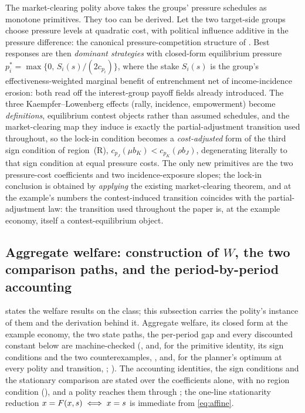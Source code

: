 The market-clearing polity above takes the groups' pressure schedules
as monotone primitives. They too can be derived. Let the two
target-side groups choose pressure levels at quadratic cost, with
political influence additive in the pressure difference: the
canonical pressure-competition structure of \citet{Becker1983}. Best
responses are then \emph{dominant strategies} with closed-form
equilibrium pressure $p_i^\ast = \max\{0,\,S_i(s)/(2c_{p_i})\}$, where
the stake $S_i(s)$ is the group's effectiveness-weighted marginal
benefit of entrenchment net of income-incidence erosion: both read
off the interest-group payoff fields already introduced. The three
Kaempfer--Lowenberg effects (rally, incidence, empowerment) become
\emph{definitions}, equilibrium contest objects rather than assumed
schedules, and the market-clearing map they induce is exactly the
partial-adjustment transition used throughout, so the lock-in
condition becomes a \emph{cost-adjusted} form of the third sign condition of region~(R),
$c_{p_J}(\mu b_K) < c_{p_K}(\rho b_J)$, degenerating literally to that
sign condition at equal pressure costs. The
only new primitives are the two pressure-cost coefficients and two
incidence-exposure slopes; the lock-in conclusion is obtained by
\emph{applying} the existing market-clearing theorem, and at the
example's numbers the contest-induced transition coincides with the
partial-adjustment law: the transition used throughout the paper is, at the
example economy, itself a contest-equilibrium object.

\subsection[Aggregate welfare: construction of W and the two comparisons]
{Aggregate welfare: construction of $W$, the two
comparison paths, and the period-by-period accounting}
\label{sec:fourgroup:planner}

 states the welfare results on the class; this
subsection carries the polity's instance of them and the derivation behind it. Aggregate
welfare, its closed form at the example economy, the two state paths, the
per-period gap and every discounted constant below are machine-checked
(,
 and, for the primitive identity,
its sign conditions and the two counterexamples,
, and, for the planner's optimum at every
polity and transition, ;
). The accounting identities, the sign conditions and
the stationary comparison are stated over the coefficients alone, with no
region condition (), and a polity reaches them through
; the
one-line stationarity reduction $x=F(x,s)\iff x=s$ is immediate from
\eqref{eq:affine}.

